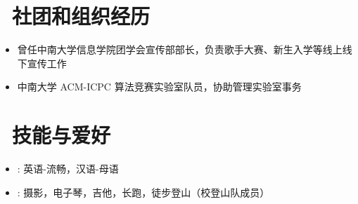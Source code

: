 \documentclass{resume}
\begin{document}
\section{\faUsers\ 社团和组织经历}
\begin{itemize}
    \item 曾任中南大学信息学院团学会宣传部部长，负责歌手大赛、新生入学等线上线下宣传工作
    \item 中南大学 ACM-ICPC 算法竞赛实验室队员，协助管理实验室事务
    
\end{itemize}
\section{\faTasks\ 技能与爱好}
\begin{itemize}[parsep=0.4ex]
  \item {}: 英语-流畅，汉语-母语
  \item {}: 摄影，电子琴，吉他，长跑，徒步登山（校登山队成员）
\end{itemize}



\end{document}
